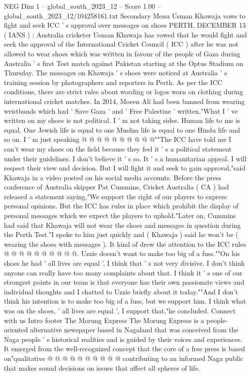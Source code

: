 \begin{textsample}{NEG Dim 1 – global\_south\_2023\_12 – Score 1.00 – global\_south\_2023\_12/104258161.txt}  \label{ex:f1_neg_416}
Secondary Menu Usman Khawaja vows to fight and seek ICC ' s approval over messages on shoes PERTH, DECEMBER 13 ( IANS ) : Australia cricketer Usman Khawaja has vowed that he would fight and seek the approval of the International Cricket Council ( ICC ) after he was not allowed to wear shoes which was written in favour of the people of Gaza during Australia ' s first Test match against Pakistan starting at the Optus Stadium on Thursday.
The messages on Khawaja ' s shoes were noticed at Australia ' s training session by photographers and reporters in Perth.
As per the ICC conditions, there are strict rules about wording or logos worn on clothing during international cricket matches.
In 2014, Moeen Ali had been banned from wearing wristbands which had ' Save Gaza ' and ' Free Palestine ' written."What I ' ve written on my shoes is not political.
I ' m not taking sides.
Human life to me is equal.
One Jewish life is equal to one Muslim life is equal to one Hindu life and so on.
I ' m just speaking @ @ @ @ @ @ @ @ @ @""The ICC have told me I can't wear my shoes on the field because they feel it ' s a political statement under their guidelines.
I don't believe it ' s so.
It ' s a humanitarian appeal.
I will respect their view and decision.
But I will fight it and seek to gain approval,"said Khawaja in a video posted on his social media accounts.
Before the press conference of Australia skipper Pat Cummins, Cricket Australia ( CA ) had released a statement saying,"We support the right of our players to express personal opinions.
But the ICC has rules in place which prohibit the display of personal messages which we expect the players to uphold."Later on, Cummins had said that Khawaja will not wear the shoes and messages in question during the Perth Test."I spoke to him just quickly and ( Khawaja ) said he won't be ( wearing the shoes with messages ).
It kind of drew the attention to the ICC rules @ @ @ @ @ @ @ @ @ @.
Uzzie doesn't want to make too big of a fuss.""On his shoes he had ' all lives are equal '.
I think that ' s not very divisive.
I don't think anyone can really have too many complaints about that.
I think it ' s one of our strongest points in our team is that everyone has their own passionate views and individual thoughts and I chatted to Uzzie briefly about it today.""And I don't think his intention is to make too big of a fuss, but we support him.
I think what was on the shoes, ' all lives are equal ', I support that,"he concluded.
Connect with us Intro footer The Morung Express The Morung Express is a people-oriented alternative newspaper based in Nagaland that was conceived from the Naga people ' s historical realities and is guided by their voices and experiences.
It emerged from the well-recognized concept that the core of a free press is based on"qualitative @ @ @ @ @ @ @ @ @ @ contributing to an informed Naga public that makes sound decisions on issues that affect all spheres of life.

\end{textsample}
